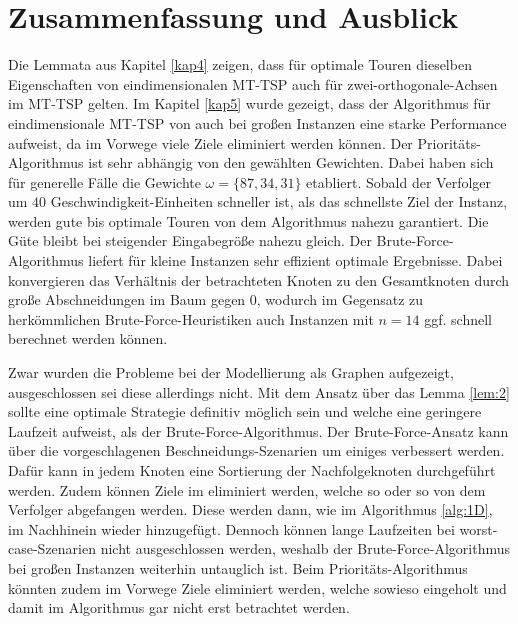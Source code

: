 \documentclass[german,version-2019-11]{uzl-thesis}
\begin{document}
\chapter{Zusammenfassung und Ausblick}
Die Lemmata aus Kapitel \ref{kap4} zeigen, dass für optimale Touren dieselben Eigenschaften von eindimensionalen MT-TSP auch für zwei-orthogonale-Achsen im MT-TSP gelten. Im Kapitel \ref{kap5} wurde gezeigt, dass der Algorithmus für eindimensionale MT-TSP von \cite{helvig} auch bei großen Instanzen eine starke Performance aufweist, da im Vorwege viele Ziele eliminiert werden können. 
Der Prioritäts-Algorithmus ist sehr abhängig von den gewählten Gewichten. Dabei haben sich für generelle Fälle die Gewichte $\omega=\{87,34,31\}$ etabliert. Sobald der Verfolger um $40$ Geschwindigkeit-Einheiten schneller ist, als das schnellste Ziel der Instanz, werden gute bis optimale Touren von dem Algorithmus nahezu garantiert. Die Güte bleibt bei steigender Eingabegröße nahezu gleich. Der Brute-Force-Algorithmus liefert für kleine Instanzen sehr effizient optimale Ergebnisse. Dabei konvergieren das Verhältnis der betrachteten Knoten zu den Gesamtknoten durch große Abschneidungen im Baum gegen $0$, wodurch im Gegensatz zu herkömmlichen Brute-Force-Heuristiken auch Instanzen mit $n=14$ ggf. schnell berechnet werden können. 

Zwar wurden die Probleme bei der Modellierung als Graphen aufgezeigt, ausgeschlossen sei diese allerdings nicht. Mit dem Ansatz über das Lemma \ref{lem:2} sollte eine optimale Strategie definitiv möglich sein und welche eine geringere Laufzeit aufweist, als der Brute-Force-Algorithmus. Der Brute-Force-Ansatz kann über die vorgeschlagenen Beschneidungs-Szenarien um einiges verbessert werden. Dafür kann in jedem Knoten eine Sortierung der Nachfolgeknoten durchgeführt werden. Zudem können Ziele im eliminiert werden, welche so oder so von dem Verfolger abgefangen werden. Diese werden dann, wie im  Algorithmus \ref{alg:1D}, im Nachhinein wieder hinzugefügt. Dennoch können lange Laufzeiten bei worst-case-Szenarien nicht ausgeschlossen werden, weshalb der Brute-Force-Algorithmus bei großen Instanzen weiterhin  untauglich ist. Beim Prioritäts-Algorithmus könnten zudem im Vorwege Ziele eliminiert werden, welche sowieso eingeholt und damit im Algorithmus gar nicht erst betrachtet werden. 
\end{document}
